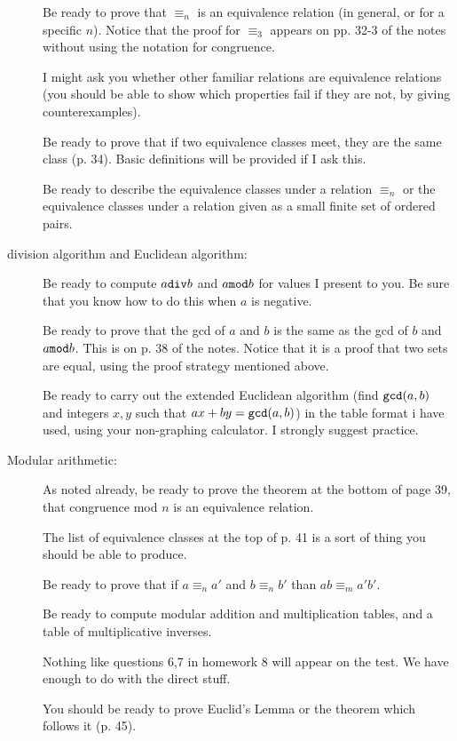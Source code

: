 \documentclass[12pt]{article}
\begin{document}
\begin{description}
Be ready to prove that $\equiv_n$ is an equivalence relation (in general, or for a specific $n$).  Notice that the proof for $\equiv_3$ appears on pp. 32-3 of the notes without using the notation for congruence.

I might ask you whether other familiar relations are equivalence relations (you should be able to show which properties fail if they are not, by giving counterexamples).

Be ready to prove that if two equivalence classes meet, they are the same class (p. 34).  Basic definitions will be provided if I ask this.

Be ready to describe the equivalence classes under a relation $\equiv_n$ or the equivalence classes under a relation given as a small finite set of ordered pairs.

\item[division algorithm and Euclidean algorithm:]

Be ready to compute $a {\tt div} b$ and $a {\tt mod} b$ for values I present to you.  Be sure that you know how to do this when $a$ is negative.

Be ready to prove that the gcd of $a$ and $b$ is the same as the gcd of $b$ and $a {\tt mod} b$.  This is on p.  38 of the notes.  Notice that it is a proof that two sets are equal, using the proof strategy mentioned above.

Be ready to carry out the extended Euclidean algorithm (find ${\tt gcd}(a,b)$ and integers $x, y$ such that
$ax+by = {\tt gcd}(a,b)$) in the table format i have used, using your non-graphing calculator.  I strongly suggest practice.

\item[Modular arithmetic:]

As noted already, be ready to prove the theorem at the bottom of page 39, that congruence mod $n$ is an equivalence relation.

The list of equivalence classes at the top of p. 41 is a sort of thing you should be able to produce.

Be ready to prove that if $a \equiv_n a'$ and $b \equiv_n b'$ than $ab \equiv_m a'b'$.

Be ready to compute modular addition and multiplication tables, and a table of multiplicative inverses.

Nothing like questions 6,7 in homework 8 will appear on the test.  We have enough to do with the direct stuff.

You should be ready to prove Euclid's Lemma or the theorem which follows it (p. 45).


\end{description}
\end{document}
